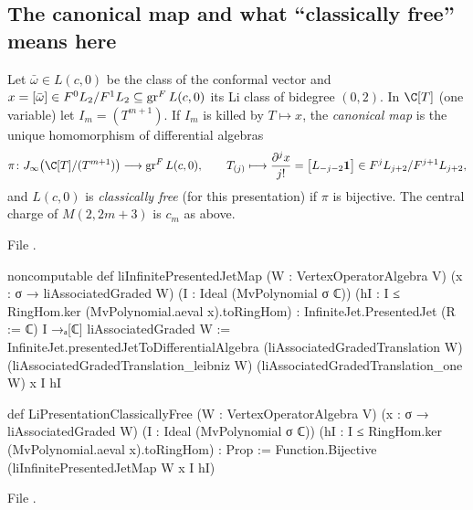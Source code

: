 \subsection{The canonical map and what ``classically free'' means here}

\begin{definition}\label{l20:def:vircanon}
Let $\bar\omega\in L(c,0)$ be the class of the conformal vector and $x=[\bar\omega]\in F^0L_2/F^1L_2\subseteq\operatorname{gr}^F L(c,0)$
its Li class of bidegree $(0,2)$. In $\C[T]$ (one variable) let $I_m=(T^{m+1})$. If $I_m$ is killed by $T\mapsto x$, the
\emph{canonical map} is the unique homomorphism of differential algebras
\begin{equation*}
\pi\colon\ltwentyJ\bigl(\C[T]/(T^{m+1})\bigr)\longrightarrow\ltwentygr L(c,0),\qquad T_{(j)}\longmapsto\frac{\partial^jx}{j!}
=\bigl[L_{-j-2}\ltwentyvac\bigr]\in F^jL_{j+2}/F^{j+1}L_{j+2},
\end{equation*}
and $L(c,0)$ is \emph{classically free} (for this presentation) if $\pi$ is bijective. The central charge of $M(2,2m+3)$ is
$c_m$ as above.
\end{definition}
\noindent File .
\begin{leancode}
noncomputable def liInfinitePresentedJetMap (W : VertexOperatorAlgebra V)
    (x : σ → liAssociatedGraded W) (I : Ideal (MvPolynomial σ ℂ))
    (hI : I ≤ RingHom.ker (MvPolynomial.aeval x).toRingHom) :
    InfiniteJet.PresentedJet (R := ℂ) I →ₐ[ℂ] liAssociatedGraded W :=
  InfiniteJet.presentedJetToDifferentialAlgebra (liAssociatedGradedTranslation W)
    (liAssociatedGradedTranslation_leibniz W) (liAssociatedGradedTranslation_one W) x I hI

def LiPresentationClassicallyFree (W : VertexOperatorAlgebra V)
    (x : σ → liAssociatedGraded W) (I : Ideal (MvPolynomial σ ℂ))
    (hI : I ≤ RingHom.ker (MvPolynomial.aeval x).toRingHom) : Prop :=
  Function.Bijective (liInfinitePresentedJetMap W x I hI)
\end{leancode}
\noindent File .
